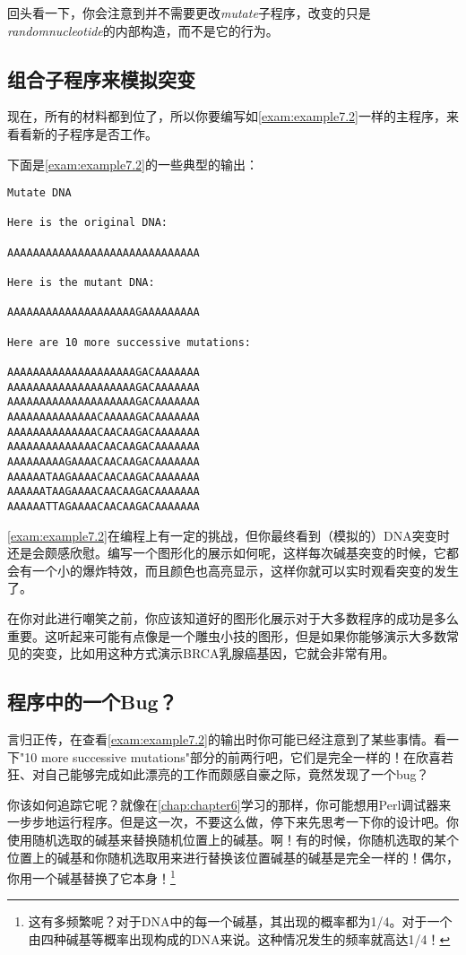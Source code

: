 回头看一下，你会注意到并不需要更改\textit{mutate}子程序，改变的只是\textit{randomnucleotide}的内部构造，而不是它的行为。

\subsection{组合子程序来模拟突变}
现在，所有的材料都到位了，所以你要编写如\autoref{exam:example7.2}一样的主程序，来看看新的子程序是否工作。



下面是\autoref{exam:example7.2}的一些典型的输出：

\begin{lstlisting}
Mutate DNA

Here is the original DNA:

AAAAAAAAAAAAAAAAAAAAAAAAAAAAAA

Here is the mutant DNA:

AAAAAAAAAAAAAAAAAAAAGAAAAAAAAA

Here are 10 more successive mutations:

AAAAAAAAAAAAAAAAAAAAGACAAAAAAA
AAAAAAAAAAAAAAAAAAAAGACAAAAAAA
AAAAAAAAAAAAAAAAAAAAGACAAAAAAA
AAAAAAAAAAAAAACAAAAAGACAAAAAAA
AAAAAAAAAAAAAACAACAAGACAAAAAAA
AAAAAAAAAAAAAACAACAAGACAAAAAAA
AAAAAAAAAGAAAACAACAAGACAAAAAAA
AAAAAATAAGAAAACAACAAGACAAAAAAA
AAAAAATAAGAAAACAACAAGACAAAAAAA
AAAAAATTAGAAAACAACAAGACAAAAAAA
\end{lstlisting}

\autoref{exam:example7.2}在编程上有一定的挑战，但你最终看到（模拟的）DNA突变时还是会颇感欣慰。编写一个图形化的展示如何呢，这样每次碱基突变的时候，它都会有一个小的爆炸特效，而且颜色也高亮显示，这样你就可以实时观看突变的发生了。

在你对此进行嘲笑之前，你应该知道好的图形化展示对于大多数程序的成功是多么重要。这听起来可能有点像是一个雕虫小技的图形，但是如果你能够演示大多数常见的突变，比如用这种方式演示BRCA乳腺癌基因，它就会非常有用。

\subsection{程序中的一个Bug？}
言归正传，在查看\autoref{exam:example7.2}的输出时你可能已经注意到了某些事情。看一下"10 more successive mutations"部分的前两行吧，它们是完全一样的！在欣喜若狂、对自己能够完成如此漂亮的工作而颇感自豪之际，竟然发现了一个bug？

你该如何追踪它呢？就像在\autoref{chap:chapter6}学习的那样，你可能想用Perl调试器来一步步地运行程序。但是这一次，不要这么做，停下来先思考一下你的设计吧。你使用随机选取的碱基来替换随机位置上的碱基。啊！有的时候，你随机选取的某个位置上的碱基和你随机选取用来进行替换该位置碱基的碱基是完全一样的！偶尔，你用一个碱基替换了它本身！\footnote{这有多频繁呢？对于DNA中的每一个碱基，其出现的概率都为1/4。对于一个由四种碱基等概率出现构成的DNA来说。这种情况发生的频率就高达1/4！} 

